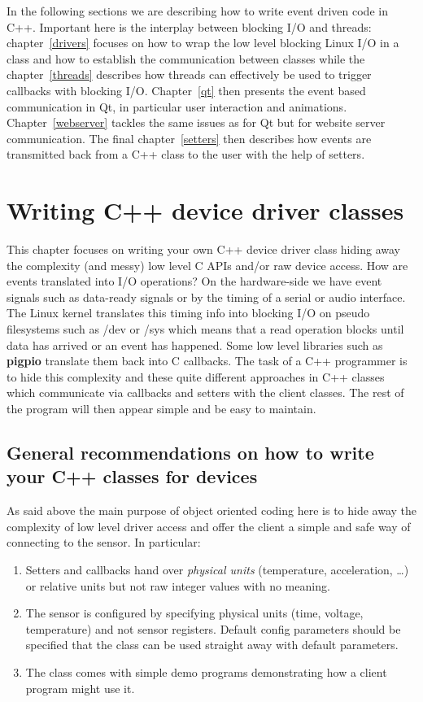 \documentclass[12pt]{report}
\begin{document}
In the following sections we are describing how to write event driven
code in C++. Important here is the interplay between blocking I/O and
threads: chapter~\ref{drivers} focuses on how to wrap the low
level blocking Linux I/O in a class and how to establish the
communication between classes while the chapter~\ref{threads}
describes how threads can effectively be used to trigger callbacks
with blocking I/O. Chapter~\ref{qt} then presents the event based
communication in Qt, in particular user interaction and animations.
Chapter~\ref{webserver} tackles the same issues as for Qt but for
website server communication. The final chapter~\ref{setters} then
describes how events are transmitted back from a C++ class to the user
with the help of setters.




\chapter{Writing C++ device driver classes\label{drivers}}
This chapter focuses on writing your own C++ device driver class
hiding away the complexity (and messy) low level C APIs and/or raw
device access. How are events translated into I/O operations? On the
hardware-side we have event signals such as data-ready signals or by
the timing of a serial or audio interface. The Linux kernel translates
this timing info into blocking I/O on pseudo filesystems such as /dev
or /sys which means that a read operation blocks until data has arrived
or an event has happened. Some low level libraries such as \textbf{pigpio}
translate them back into C callbacks. The task of a C++ programmer is
to hide this complexity and these quite different approaches in C++
classes which communicate via callbacks and setters with the client
classes. The rest of the program will then appear simple and be
easy to maintain.

\section{General recommendations on how to write your C++ classes for devices}
As said above the main purpose of object oriented coding here is to
hide away the complexity of low level driver access and offer the
client a simple and safe way of connecting to the sensor. In
particular:
\begin{enumerate}
\item Setters and callbacks hand over \textsl{physical units}
  (temperature, acceleration, \ldots) or relative units but not raw
  integer values with no meaning.
\item The sensor is configured by specifying physical units (time,
  voltage, temperature) and not sensor registers. Default config parameters
  should be specified that the class can be used straight away with
  default parameters.
\item The class comes with simple demo programs demonstrating how
  a client program might use it.
\end{enumerate}
\end{document}
